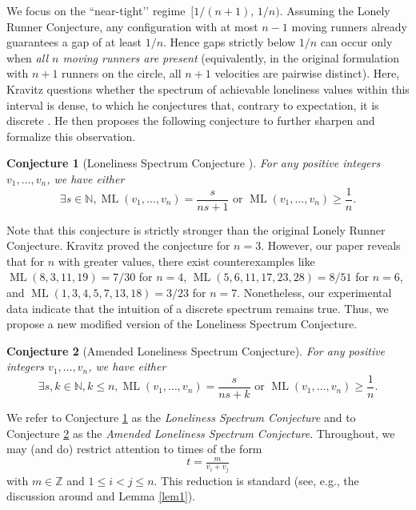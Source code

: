 \documentclass[11pt]{amsart}
\newtheorem{conj}{Conjecture}[section]
\DeclareMathOperator{\ML}{ML}
\begin{document}
\par We focus on the “near-tight’’ regime $\,[1/(n+1),\,1/n)$. 
Assuming the Lonely Runner Conjecture, any configuration with at most $n-1$ moving runners already guarantees a gap of at least $1/n$.  Hence gaps strictly below $1/n$ can occur only when \emph{all $n$ moving runners are present} (equivalently, in the original formulation with $n+1$ runners on the circle, all $n+1$ velocities are pairwise distinct).
 Here, Kravitz questions whether the spectrum of achievable loneliness values within this interval is dense, to which he conjectures that, contrary to expectation, it is discrete \cite{kravitz}. He then proposes the following conjecture to further sharpen and formalize this observation.
\begin{conj}[Loneliness Spectrum Conjecture \cite{kravitz}]
\label{con1}
    For any positive integers $v_1,\ldots,v_n$, we have either
    $$\exists s \in \mathbb{N},  \ML(v_1,\ldots,v_n) = \frac{s}{ns + 1} \text{ or } \ML(v_1,\ldots,v_n) \geq \frac{1}{n}.$$
\end{conj}
Note that this conjecture is strictly stronger than the original Lonely Runner Conjecture. Kravitz proved the conjecture for $n = 3$. However, our paper reveals that for $n$ with greater values, there exist counterexamples like $\ML(8,3,11,19) = 7 / 30$ for $n = 4$, $\ML(5,6,11,17,23,28) = 8 / 51$ for $n = 6$, and $\ML(1,3,4,5,7,13,18) = 3 / 23$ for $n = 7$. Nonetheless, our experimental data indicate that the intuition of a discrete spectrum remains true. Thus, we propose a new modified version of the Loneliness Spectrum Conjecture.
\begin{conj}[Amended Loneliness Spectrum Conjecture]
\label{con2}
    For any positive integers $v_1,\ldots,v_n$, we have either
    $$\exists s,k \in \mathbb{N},k \leq n,  \ML(v_1,\ldots,v_n) = \frac{s}{ns + k} \text{ or } \ML(v_1,\ldots,v_n) \geq \frac{1}{n}.$$
\end{conj}
\par We refer to Conjecture \ref{con1} as the \emph{Loneliness Spectrum Conjecture} and to Conjecture \ref{con2} as the \emph{Amended Loneliness Spectrum Conjecture}.  Throughout, we may (and do) restrict attention to times of the form 
$$t=\tfrac{m}{v_i+v_j}$$
with $m\in\mathbb{Z}$ and $1\le i<j\le n$. This reduction is standard (see, e.g., the discussion around \cite[Prop.~2.1]{kravitz} and Lemma \ref{lem1}).
\end{document}
